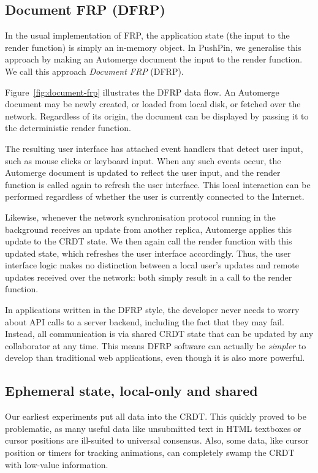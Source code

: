 \documentclass[sigplan,10pt]{acmart}
\begin{document}
\subsection{Document FRP (DFRP)}

In the usual implementation of FRP, the application state (the input to the render function) is simply an in-memory object.
In PushPin, we generalise this approach by making an Automerge document the input to the render function.
We call this approach \emph{Document FRP} (DFRP).

Figure~\ref{fig:document-frp} illustrates the DFRP data flow.
An Automerge document may be newly created, or loaded from local disk, or fetched over the network.
Regardless of its origin, the document can be displayed by passing it to the deterministic render function.

The resulting user interface has attached event handlers that detect user input, such as mouse clicks or keyboard input.
When any such events occur, the Automerge document is updated to reflect the user input, and the render function is called again to refresh the user interface.
This local interaction can be performed regardless of whether the user is currently connected to the Internet.

Likewise, whenever the network synchronisation protocol running in the background receives an update from another replica, Automerge applies this update to the CRDT state.
We then again call the render function with this updated state, which refreshes the user interface accordingly.
Thus, the user interface logic makes no distinction between a local user's updates and remote updates received over the network: both simply result in a call to the render function.

In applications written in the DFRP style, the developer never needs to worry about API calls to a server backend, including the fact that they may fail.
Instead, all communication is via shared CRDT state that can be updated by any collaborator at any time.
This means DFRP software can actually be \emph{simpler} to develop than traditional web applications, even though it is also more powerful.


\subsection{Ephemeral state, local-only and shared}

Our earliest experiments put all data into the CRDT. This quickly proved to be problematic, as many useful data like unsubmitted text in HTML textboxes or cursor positions are ill-suited to universal consensus. Also, some data, like cursor position or timers for tracking animations, can completely swamp the CRDT with low-value information.
\end{document}
